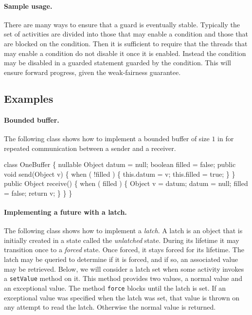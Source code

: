 \paragraph{Sample usage.} 
There are many ways to ensure that a guard is eventually
stable. Typically the set of activities are divided into those that
may enable a condition and those that are blocked on the
condition. Then it is sufficient to require that the threads that may
enable a condition do not disable it once it is enabled. Instead the
condition may be disabled in a guarded statement guarded by the
condition. This will ensure forward progress, given the weak-fairness
guarantee.

\subsection{Examples}

\paragraph{Bounded buffer.}
The following class shows how to implement a bounded buffer of size
$1$ in \Xten{} for repeated communication between a sender and a
receiver.

\begin{x10}
class OneBuffer \{
  nullable Object datum = null;
  boolean filled = false;
  public 
    void send(Object v) \{
      when ( !filled ) \{
        this.datum = v;
        this.filled = true;
    \}
 \}
  public
    Object receive() \{
      when ( filled ) \{
        Object v  = datum;
        datum = null;
        filled = false;
        return v;
      \}
  \}
\}
\end{x10}

\paragraph{ Implementing a future with a latch.}\label{future-imp}
The following class shows how to implement a {\em latch}. A latch is
an object that is initially created in a state called the {\em
unlatched} state. During its lifetime it may transition once to a {\em
forced} state. Once forced, it stays forced for its lifetime. The
latch may be queried to determine if it is forced, and if so, an
associated value may be retrieved. Below, we will consider a latch set
when some activity invokes a {\tt setValue} method on it. This method
provides two values, a normal value and an exceptional value. The
method {\tt force} blocks until the latch is set. If an exceptional
value was specified when the latch was set, that value is thrown on
any attempt to read the latch. Otherwise the normal value is returned.


